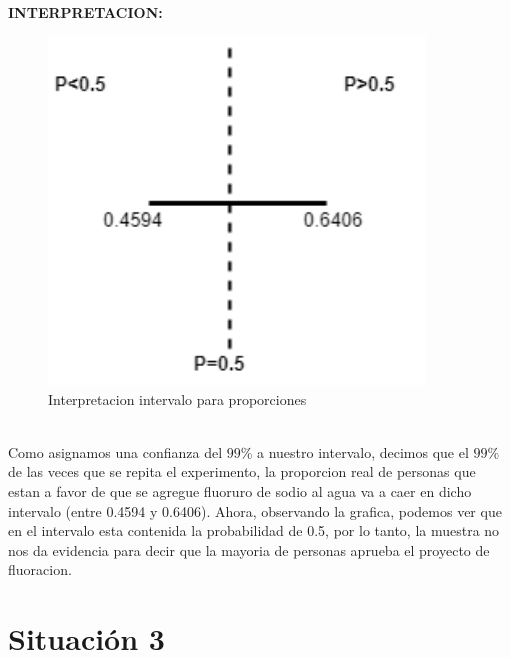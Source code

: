 \documentclass[letterpaper,12pt,onecolumn,titlepage]{article}
\begin{document}
~\\ \textbf{INTERPRETACION:}
 \begin{figure}[!h]
    \begin{center}
        \includegraphics[width=10cm]{Figuras/Grafico1.png}
        \caption{Interpretacion intervalo para proporciones}
        \label{fig:Densidad}
    \end{center}
\end{figure}

~\\ Como asignamos una confianza del $99\%$ a nuestro intervalo, decimos que el $99\%$ de las veces que se repita el experimento, la proporcion real de personas que estan a favor de que se agregue fluoruro de sodio al agua va a caer en dicho intervalo (entre 0.4594 y 0.6406). Ahora, observando la grafica, podemos ver que en el intervalo esta contenida la probabilidad de 0.5, por lo tanto, la muestra no nos da evidencia para decir que la mayoria de personas aprueba el proyecto de fluoracion.

\pagebreak\section{Situaci\'{o}n 3}
\end{document}
